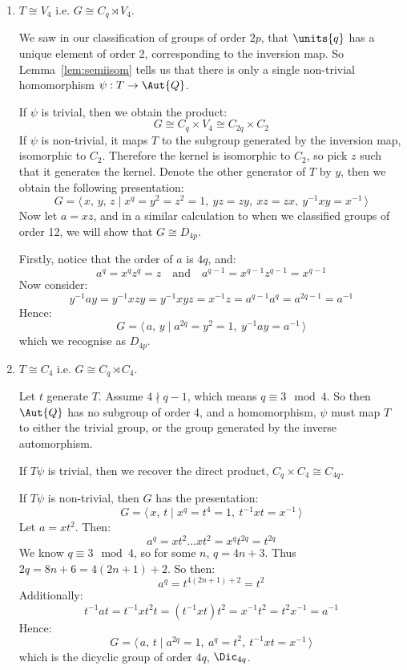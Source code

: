 \begin{enumerate}
    \item \(T \cong V_4\) i.e. \(G \cong C_q \rtimes V_4\).

    We saw in our classification of groups of order \(2p\), that \(\units{q}\) has a unique element of order 2,
    corresponding to the inversion map.
    So Lemma~\ref{lem:semiisom} tells us that there is only a single non-trivial homomorphism \(\psi:T \to \Aut{Q}\).

    If \(\psi\) is trivial, then we obtain the product:
    \[G \cong C_q \times V_4 \cong C_{2q} \times C_2\]
    If \(\psi\) is non-trivial, it maps \(T\) to the subgroup generated by the inversion map, isomorphic to \(C_2\).
    Therefore the kernel is isomorphic to \(C_2\), so pick \(z\) such that it generates the kernel.
    Denote the other generator of \(T\) by \(y\), then we obtain the following presentation:
    \[G = \langle\, x,\,y,\,z \mid x^q = y^2 = z^2 = 1,\ yz = zy,\ xz = zx,\ y^{-1}xy = x^{-1}\,\rangle\]
    Now let \(a = xz\), and in a similar calculation to when we classified groups of order 12, we will show that \(G
    \cong D_{4p}\).

    Firstly, notice that the order of \(a\) is \(4q\), and:
    \[a^q = x^q z^q = z \quad \text{and} \quad a^{q-1} = x^{q-1} z^{q-1} = x^{q-1}\]
    Now consider:
    \[y^{-1}ay = y^{-1}xzy = y^{-1}xyz = x^{-1}z = a^{q-1} a^q = a^{2q-1} = a^{-1}\]
    Hence:
    \[G = \langle\, a,\,y \mid a^{2q} = y^2 = 1,\ y^{-1}ay = a^{-1}\,\rangle\]
    which we recognise as \(D_{4p}\).

    \item \(T \cong C_4\) i.e. \(G \cong C_q \rtimes C_4\).

        Let \(t\) generate \(T\).
        Assume \(4 \nmid q-1\), which means \(q \equiv 3 \mod{4}\).
        So then \(\Aut{Q}\) has no subgroup of order 4, and a homomorphism, \(\psi\) must map \(T\) to either the
        trivial group, or the group generated by the inverse automorphism.

        If \(T\psi\) is trivial, then we recover the direct product, \(C_q \times C_4 \cong C_{4q}\).

        If \(T\psi\) is non-trivial, then \(G\) has the presentation:
        \[G = \langle\, x,\,t \mid x^q = t^4 = 1,\ t^{-1}xt = x^{-1}\,\rangle\]
        Let \(a = xt^2\).
        Then:
        \[a^q = xt^2\dots xt^2 = x^q t^{2q} = t^{2q}\]
        We know \(q \equiv 3 \mod{4}\), so for some \(n\), \(q = 4n + 3\).
        Thus \(2q = 8n + 6 = 4(2n + 1) + 2\).
        So then:
        \[a^q = t^{4(2n + 1) + 2} = t^2\]
        Additionally:
        \[t^{-1}at = t^{-1}xt^2t = (t^{-1}xt)t^2 = x^{-1}t^2 = t^2 x^{-1} = a^{-1}\]
        Hence:
        \[G = \langle\, a,\,t \mid a^{2q} = 1,\ a^q = t^2,\ t^{-1}xt = x^{-1}\,\rangle\]
        which is the dicyclic group of order \(4q\), \(\Dic_{4q}\).


\end{enumerate}
